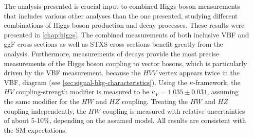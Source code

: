The analysis presented is crucial input to combined Higgs boson measurements~\cite{NaturePaper} that includes various other analyses than the one presented, studying different combinations of Higgs boson production and decay processes.
These results were presented in \cref{chap:higgs}.
The combined measurements of both inclusive VBF and ggF cross sections as well as STXS cross sections benefit greatly from the \HWW analysis.
Furthermore, measurements of \HWW decays provide the most precise measurements of the Higgs boson coupling to vector bosons, which is particularly driven by the VBF measurement, because the $HVV$ vertex appears twice in the VBF, \HWW diagram (see \cref{sec:signal-bkg-characteristics}). 
Using the $\kappa$-framework, the $HV$ coupling-strength modifier is measured to be $\kappa_{V} = 1.035 \pm 0.031$, assuming the same modifier for the $HW$ and $HZ$ coupling.
Treating the $HW$ and $HZ$ coupling independently, the $HW$ coupling is measured with relative uncertainties of about 5-10\%, depending on the assumed model. All results are consistent with the SM expectations. 






